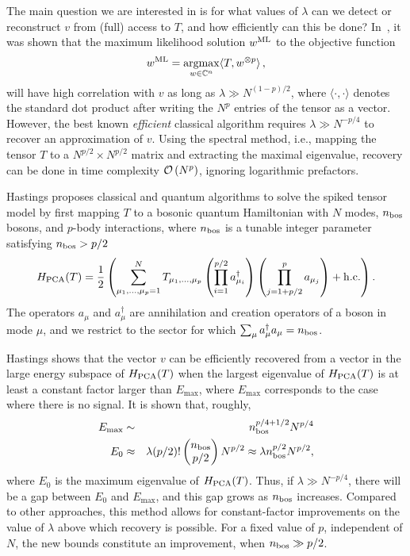 \begin{refsection}
The main question we are interested in is for what values of $\lambda$  can we detect or reconstruct  $v$ from (full) access to $T$, and how efficiently can this be done? 
In~\cite{richard2014statistical}, it was shown that  the maximum likelihood solution $w^{\rm ML}$ to the objective function
\begin{equation}
    w^{\rm ML} = \operatorname*{argmax}_{w\in \mathbb{C}^n} \langle T, w^{\otimes p}\rangle\,,
\end{equation}
will have high correlation with $v$ as long as $\lambda\gg N^{(1-p)/2}$, where $\langle \cdot, \cdot \rangle$ denotes the standard dot product after writing the $N^p$ entries of the tensor as a vector. However, the best known \emph{efficient} classical algorithm \cite{wein2019kikuchi} requires $\lambda\gg N^{-p/4}$ to recover an approximation of $v$. Using the spectral method, i.e., mapping the tensor $T$ to a $N^{p/2} \times N^{p/2}$ matrix and extracting the maximal eigenvalue, recovery can be done in time complexity $\mathcal{O}\left( N^p \right)$, ignoring logarithmic prefactors. 






Hastings \cite{hastings2020classical} proposes classical and quantum algorithms to solve the spiked tensor model by first mapping $T$ to a bosonic quantum Hamiltonian with $N$ modes, $n_{\rm bos}$ bosons, and $p$-body interactions, where $n_{\rm{bos}}$ is a tunable integer parameter satisfying $n_{\rm bos} > p/2$
\begin{equation}
    H_{\rm PCA}(T) = \frac{1}{2}\left(\sum_{\mu_1,...,\mu_p =1}^{N} T_{\mu_1,...,\mu_p} \left(\prod_{i=1}^{p/2}a^\dag_{\mu_i}\right)\left(\prod_{j=1+p/2}^{p}a_{\mu_j}\right)+ \mathrm{h.c.}\right)\label{eq:hamPCA}.
\end{equation}
The operators $a_\mu$ and $a^\dag_\mu$ are annihilation and creation operators of a boson in mode $\mu$, and we restrict to the sector for which $\sum_\mu a^\dag_\mu a_\mu = n_{\rm bos}$.

Hastings shows that the vector $v$ can be efficiently recovered from a vector in the large energy subspace of $H_{\rm PCA}(T)$ when the largest eigenvalue of $H_{\rm PCA}(T)$ 
is at least a constant factor larger than $E_{\max}$, where $E_{\max}$ corresponds to the case where there is no signal. It is shown that, roughly,  
\begin{eqnarray}
E_{\max} &\sim& n_{\rm bos}^{p/4+1/2}N^{p/4}\\
E_0 &\approx& \lambda (p/2)!\left(\begin{matrix}n_{\rm bos}\\ p/2\end{matrix} \right) N^{p/2} \approx \lambda n_{\rm bos}^{p/2}N^{p/2},
\end{eqnarray}
where $E_0$ is the maximum eigenvalue of $H_{\rm PCA}(T)$. Thus, if $\lambda \gg N^{-p/4}$, there will be a gap between $E_0$ and $E_{\max}$, and this gap grows as $n_{\rm bos}$ increases. Compared to other approaches, this method allows for constant-factor improvements on the value of $\lambda$ above which recovery is possible.  
For a fixed value of $p$, independent of $N$, the new bounds constitute an improvement, when $n_{\rm bos}\gg p/2$. 


\end{refsection}
